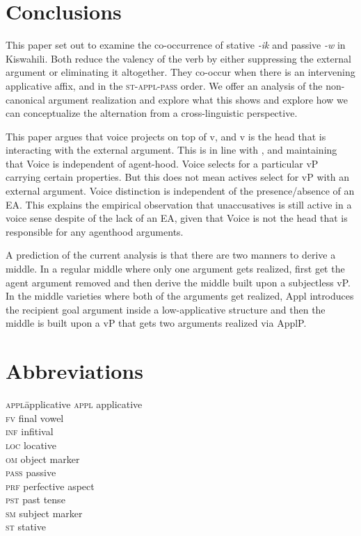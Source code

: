 \documentclass[output=paper]{langscibook}
\begin{document}
\section{Conclusions}
This paper set out to examine the co-occurrence of stative \textit{-ik} and passive \textit{-w} in Kiswahili. Both reduce the valency of the verb by either suppressing the external argument or eliminating it altogether. They co-occur when there is an intervening applicative affix, and in the \textsc{st-appl-pass} order. We offer an analysis of the non-canonical argument realization and explore what this shows and explore how we can conceptualize the alternation from a cross-linguistic perspective. 

This paper argues that voice projects on top of v, and v is the head that is interacting with the external argument. This is in line with \citet{Collins:2005aa}, and \citet{johnson04} maintaining that Voice is independent of agent-hood. Voice selects for a particular vP carrying certain properties. But this does not mean actives select for vP with an external argument. Voice distinction is independent of the presence/absence of an EA. This explains the empirical observation that unaccusatives is still active in a voice sense despite of the lack of an EA, given that Voice is not the head that is responsible for any agenthood arguments.

A prediction of the current analysis is that there are two manners to derive a middle. In a regular middle where only one argument gets realized, first get the agent argument removed and then derive the middle built upon a subjectless vP. In the middle varieties where both of the arguments get realized, Appl introduces the recipient goal argument inside a low-applicative structure and then the middle is built upon a vP that gets two arguments realized via ApplP.

\section*{Abbreviations}
\begin{multicols}{3}
\begin{tabbing}
\textsc{appl}\hspace{1ex}\= applicative\kill
\textsc{appl} \> applicative\\
\textsc{fv} \> final vowel\\
\textsc{inf} \> infitival\\
\textsc{loc} \> locative \\
\textsc{om} \> object marker\\
\textsc{pass} \> passive\\
\textsc{prf} \> perfective aspect\\
\textsc{pst} \> past tense\\
\textsc{sm} \> subject marker\\
\textsc{st} \> stative
\end{tabbing}
\end{multicols}
\end{document}
